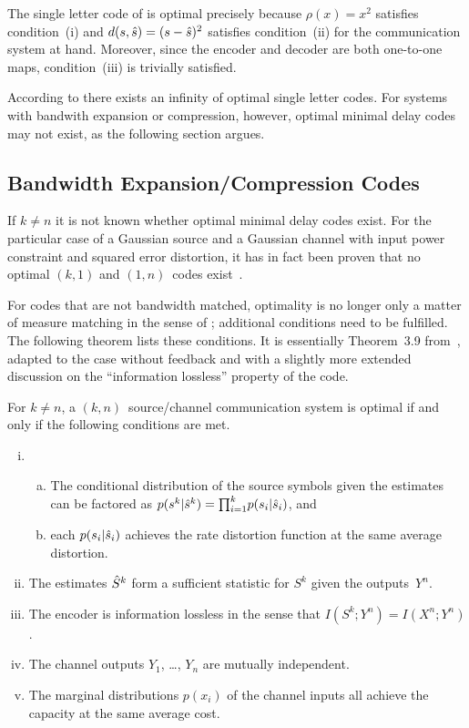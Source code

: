 The single letter code of  is optimal precisely because
$\rho(x) = x^2$ satisfies condition~(i) and $d(s,{\hat{s}}) = (s - {\hat{s}})^2$ satisfies
condition~(ii) for the communication system at hand. Moreover, since the encoder
and decoder are both one-to-one maps, condition~(iii) is trivially satisfied.

According to  there exists an infinity of optimal
single letter codes. For systems with bandwith expansion or compression,
however, optimal minimal delay codes may not exist, as the following section
argues.


\subsection{Bandwidth Expansion/Compression Codes}

If $k \ne n$ it is not known whether optimal minimal delay codes exist.  For the
particular case of a Gaussian source and a Gaussian channel with input power
constraint and squared error distortion, it has in fact been proven that no
optimal $(k,1)$ and $(1,n)$~codes exist~\cite{IngberLZF2008}.

For codes that are not bandwidth matched, optimality is no longer only a matter
of measure matching in the sense of ; additional conditions
need to be fulfilled. The following theorem lists these conditions. It is
essentially Theorem~3.9 from~\cite{GastparThesis}, adapted to the case without
feedback and with a slightly more extended discussion on the ``information
lossless'' property of the code. 

\begin{theorem}
  \label{thm:tcntc1n}
  For $k \ne n$, a $(k, n)$~source/channel communication system is optimal if
  and only if the following conditions are met.
  \begin{enumerate}[(i)]
    \item
      \begin{enumerate}[(a)]
        \item The conditional distribution of the source symbols given the
          estimates can be factored as $p(s^k|{\hat{s}}^k) = {\prod_{i=1}^k} p(s_i|{\hat{s}}_i)$, and
        \item each $p(s_i|{\hat{s}}_i)$ achieves the rate distortion function at the
          same average distortion.
      \end{enumerate}

    \item The estimates ${\hat{S}}^k$ form a sufficient statistic for $S^k$ given the
      outputs~$Y^n$.

    \item The encoder is information lossless in the sense that $I(S^k; Y^n) =
      I(X^n; Y^n)$. 

    \item The channel outputs $Y_1$, \ldots, $Y_n$ are mutually independent.

    \item The marginal distributions $p(x_i)$ of the channel inputs all achieve
      the capacity at the same average cost.
  \end{enumerate}
\end{theorem}

